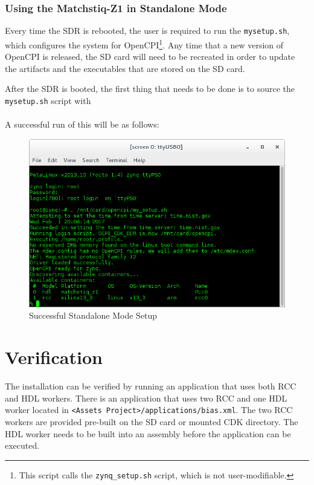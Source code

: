 \subsubsection*{Using the Matchstiq-Z1 in Standalone Mode}
\begin{flushleft}
Every time the SDR is rebooted, the user is required to run the \texttt{mysetup.sh}, which configures the system for OpenCPI\footnote{This script calls the \texttt{zynq\_setup.sh} script, which is not user-modifiable.}. Any time that a new version of OpenCPI is released, the SD card will need to be recreated in order to update the artifacts and the executables that are stored on the SD card.
\end{flushleft}
\begin{flushleft}
After the SDR is booted, the first thing that needs to be done is to source the \texttt{mysetup.sh} script with\\
\leavevmode{\parindent=3em\indent}\\
A successful run of this will be as follows:
\end{flushleft}

\begin{figure}[ht]
	\centerline{\includegraphics[scale=0.5]{Matchstiq_Z1_setup}}
	\caption{Successful Standalone Mode Setup}
	\label{fig:standalonesetup}
\end{figure}

\section{Verification}
The installation can be verified by running an application that uses both RCC and HDL workers.  There is an application that uses two RCC and one HDL worker located in \texttt{<Assets Project>/applications/bias.xml}. The two RCC workers are provided pre-built on the SD card or mounted CDK directory.  The HDL worker needs to be built into an assembly before the application can be executed.
